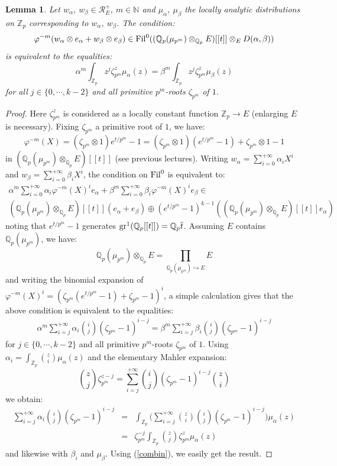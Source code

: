 \documentclass[11pt]{amsart}
\def\Z{{\mathbb Z}_p}
\def\Q{{\mathbb Q}_p}
\newtheorem{lem}[definit]{\bf{Lemma}}
\begin{document}
\begin{lem}\label{explicit} 
Let $w_{\alpha},\ w_{\beta}\in {\mathcal R}_E^+$, $m\in {\mathbb N}$
and $\mu_{\alpha},\ \mu_{\beta}$ the locally analytic distributions on
$\Z$ corresponding to $w_{\alpha},\ w_{\beta}$. The condition:  
$$\varphi^{-m}(w_{\alpha}\otimes e_{\alpha}+w_{\beta}\otimes
e_{\beta})\in {\rm
  Fil}^0((\Q(\mu_{p^m})\otimes_{\Q}E)[[t]]\otimes_ED(\alpha,\beta))$$  
is equivalent to the equalities:  
$$\alpha^m\int_{\Z}z^j\zeta_{p^m}^z\mu_{\alpha}(z)
=\beta^m\int_{\Z}z^j\zeta_{p^m}^z\mu_{\beta}(z)$$  
for all $j\in \{0,\cdots,k-2\}$ and all primitive $p^m$-roots $\zeta_{p^m}$ of $1$. 
\end{lem} 
\begin{proof} 
Here $\zeta_{p^m}^z$ is considered as a locally constant function
$\Z\rightarrow E$ (enlarging $E$ is necessary). Fixing $\zeta_{p^m}$ a
primitive root of $1$, we have:  
$$\varphi^{-m}(X)=(\zeta_{p^m}\otimes 1)e^{t/p^m}-1
=(\zeta_{p^m}\otimes 1)(e^{t/p^m}-1)+\zeta_{p^m}\otimes 1-1$$ 
in $(\Q(\mu_{p^m})\otimes_{\Q}E)[[t]]$ (see previous
lectures). Writing $w_{\alpha}=\sum_{i=0}^{+\infty}\alpha_iX^i$ and
$w_{\beta}=\sum_{i=0}^{+\infty}\beta_iX^i$, the condition on ${\rm
  Fil}^0$ is equivalent to:  
\begin{eqnarray*} 
\alpha^m\sum_{i=0}^{+\infty}\alpha_i\varphi^{-m}(X)^i 
e_{\alpha}+\beta^m\sum_{i=0}^{+\infty}\beta_i\varphi^{-m}(X)^ie_{\beta}\in\\
(\Q(\mu_{p^m})\otimes_{\Q}E)[[t]](e_{\alpha}+e_{\beta})\oplus   
(e^{t/p^m}-1)^{k-1}((\Q(\mu_{p^m})\otimes_{\Q}E)[[t]]e_{\alpha}) 
\end{eqnarray*} 
noting that $e^{t/p^m}-1$ generates ${\rm gr}^1(\Q[[t]])=\Q\overline
t$. Assuming $E$ contains $\Q(\mu_{p^m})$, we have: 
$$\Q(\mu_{p^m})\otimes_{\Q}E=\prod_{\Q(\mu_{p^m})\hookrightarrow E} E$$ 
and writing the binomial expansion of
$\varphi^{-m}(X)^i=(\zeta_{p^m}(e^{t/p^m}-1)+\zeta_{p^m}-1)^i$, a
simple calculation gives that the above condition is equivalent to the
equalities:  
\begin{eqnarray}\label{combin} 
\alpha^m\sum_{i=j}^{+\infty}\alpha_i{i\choose j}(\zeta_{p^m}-1)^{i-j}
=\beta^m\sum_{i=j}^{+\infty}\beta_i{i\choose j}(\zeta_{p^m}-1)^{i-j} 
\end{eqnarray} 
for $j\in \{0,\cdots,k-2\}$ and all primitive $p^m$-roots
$\zeta_{p^m}$ of $1$. Using $\alpha_i=\int_{\Z}{z\choose
  i}\mu_{\alpha}(z)$ and the elementary Mahler expansion:  
$${z\choose j}\zeta_{p^m}^{z-j}=\sum_{i=j}^{+\infty}{i\choose
  j}(\zeta_{p^m}-1)^{i-j}{z\choose i}$$  
we obtain: 
\begin{eqnarray*} 
\sum_{i=j}^{+\infty}\alpha_i{i\choose
  j}(\zeta_{p^m}-1)^{i-j}&=&\int_{\Z}
\Big(\sum_{i=j}^{+\infty}{z\choose i}{i\choose
  j}(\zeta_{p^m}-1)^{i-j}\Big)\mu_{\alpha}(z)\\  
&=&\zeta_{p^m}^{-j}\int_{\Z}{z\choose j}\zeta_{p^m}^{z}\mu_{\alpha}(z) 
\end{eqnarray*} 
and likewise with $\beta_i$ and $\mu_{\beta}$. 
Using (\ref{combin}), we easily get the result. 
\end{proof} 
 
\end{document}
